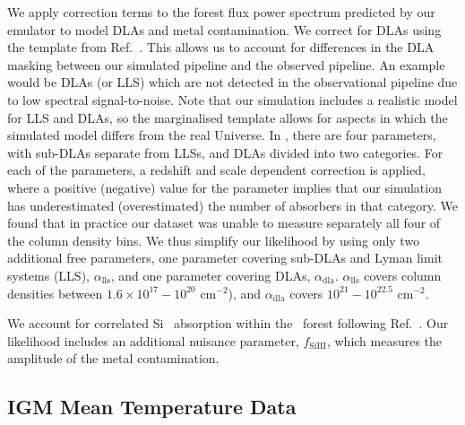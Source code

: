 We apply correction terms to the \lya forest flux power spectrum predicted by our emulator to model DLAs and metal contamination. We correct for DLAs using the template from Ref.~\cite{2018MNRAS.474.3032R}. This allows us to account for differences in the DLA masking between our simulated pipeline and the observed pipeline. An example would be DLAs (or LLS) which are not detected in the observational pipeline due to low spectral signal-to-noise. Note that our simulation includes a realistic model for LLS and DLAs, so the marginalised template allows for aspects in which the simulated model differs from the real Universe. In \cite{2018MNRAS.474.3032R}, there are four parameters, with sub-DLAs separate from LLSs, and DLAs divided into two categories. For each of the parameters, a redshift and scale dependent correction is applied, where a positive (negative) value for the parameter implies that our simulation has underestimated (overestimated) the number of absorbers in that category. 
We found that in practice our dataset was unable to measure separately all four of the column density bins. We thus simplify our likelihood by using only two additional free parameters, one parameter covering sub-DLAs and Lyman limit systems (LLS), $\alpha_{\mathrm{lls}}$, and one parameter covering DLAs, $\alpha_{\mathrm{dla}}$.
$\alpha_{\mathrm{lls}}$ covers column densities between $1.6\times10^{17} - 10^{20}$ cm$^{-2}$), and $\alpha_{\mathrm{dla}}$ covers $10^{21}-10^{22.5}$  cm$^{-2}$. 

We account for correlated Si~{} absorption within the \lya~forest following Ref.~\cite{2006ApJS..163...80M}. Our likelihood includes an additional nuisance parameter, $f_\mathrm{SiIII}$, which measures the amplitude of the metal contamination. 


\subsection{IGM Mean Temperature Data}\label{sec:t0data}

